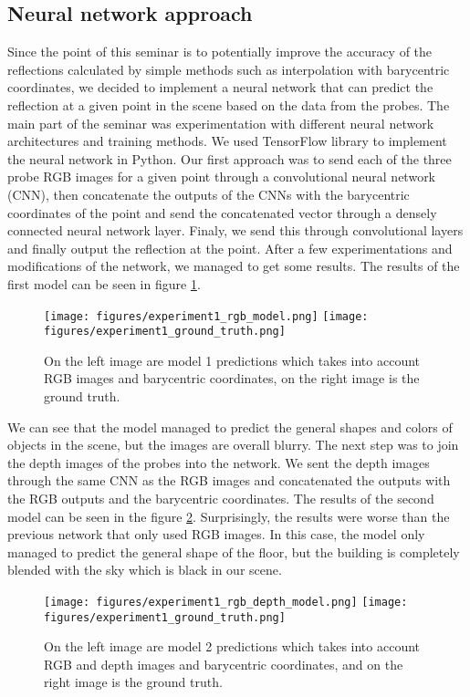 \subsection{Neural network approach}
Since the point of this seminar is to potentially improve the accuracy of the reflections calculated by simple methods such as interpolation with barycentric coordinates, we decided to implement a neural network that can predict the reflection at a given point in the scene based on the data from the probes.
The main part of the seminar was experimentation with different neural network architectures and training methods. 
We used TensorFlow library to implement the neural network in Python. Our first approach was to send each of the three probe RGB images for a given point through a convolutional neural network (CNN), then concatenate the outputs of the CNNs with the barycentric coordinates of the point and send the concatenated vector through a densely connected neural network layer. Finaly, we send this through convolutional layers and finally output the reflection at the point.
After a few experimentations and modifications of the network, we managed to get some results. The results of the first model can be seen in figure \ref{fig:neural_network_1}.
\begin{figure}[htb]
    \centering
    \texttt{[image: figures/experiment1\_rgb\_model.png]}
    \texttt{[image: figures/experiment1\_ground\_truth.png]}

    \caption{On the left image are model 1 predictions which takes into account RGB images and barycentric coordinates, on the right image is the ground truth.}
    \label{fig:neural_network_1}
\end{figure}
We can see that the model managed to predict the general shapes and colors of objects in the scene, but the images are overall blurry.
The next step was to join the depth images of the probes into the network. We sent the depth images through the same CNN as the RGB images and concatenated the outputs with the RGB outputs and the barycentric coordinates.
The results of the second model can be seen in the figure \ref{fig:neural_network_2}. Surprisingly, the results were worse than the previous network that only used RGB images. In this case, the model only managed to predict the general shape of the floor, but the building is completely blended with the sky which is black in our scene.

\begin{figure}[htb]
    \centering
    \texttt{[image: figures/experiment1\_rgb\_depth\_model.png]}
    \texttt{[image: figures/experiment1\_ground\_truth.png]}

    \caption{On the left image are model 2 predictions which takes into account RGB and depth images and barycentric coordinates, and on the right image is the ground truth.}
    \label{fig:neural_network_2}
\end{figure}

